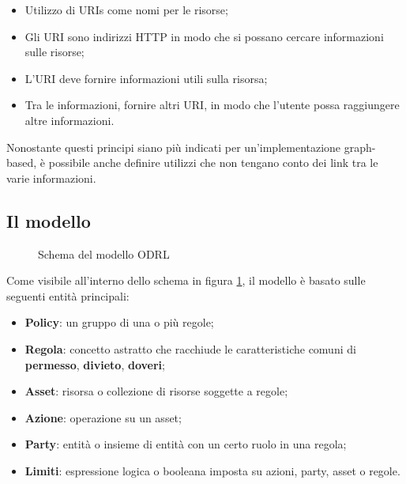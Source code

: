 \documentclass[12pt,a4paper,twoside]{book}
\begin{document}
\begin{itemize}\label{linkedDataPrinc}
\item Utilizzo di URIs come nomi per le risorse;
\item Gli URI sono indirizzi HTTP in modo che si possano cercare informazioni sulle risorse;
\item L'URI deve fornire informazioni utili sulla risorsa;
\item Tra le informazioni, fornire altri URI, in modo che l'utente possa raggiungere altre informazioni.
\end{itemize}
Nonostante questi principi siano più indicati per un'implementazione graph-based, è possibile anche definire utilizzi che non tengano conto dei link tra le varie informazioni.
\subsection{Il modello}\label{modello}
\begin{figure}[H]
	\centering
	\def\svgwidth{\columnwidth}
	
	\caption{Schema del modello ODRL\cite{ODRLinfMod}\label{ODRLModelSchema}}
\end{figure}
Come visibile all'interno dello schema in figura \ref{ODRLModelSchema}, il modello è basato sulle seguenti entità principali:
\begin{itemize}
	\item \textbf{Policy}: un gruppo di una o più regole;
	\item \textbf{Regola}: concetto astratto che racchiude le caratteristiche comuni di \textbf{permesso}, \textbf{divieto}, \textbf{doveri};
	\item \textbf{Asset}: risorsa o collezione di risorse soggette a regole;
	\item \textbf{Azione}: operazione su un asset;
	\item \textbf{Party}: entità o insieme di entità con un certo ruolo in una regola;
	\item \textbf{Limiti}: espressione logica o booleana imposta su azioni, party, asset o regole.
\end{itemize}
\end{document}
